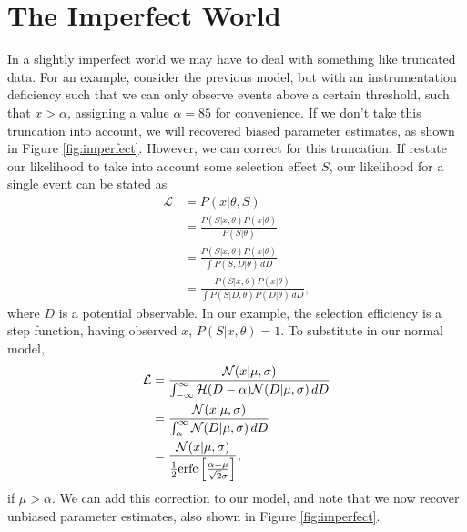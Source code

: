 \documentclass[a4paper,fleqn,usenatbib]{mnras}
\begin{document}
\section{The Imperfect World}

In a slightly imperfect world we may have to deal with something like truncated data. For an example, consider the previous model, but with an instrumentation deficiency such that we can only observe events above a certain threshold, such that $x > \alpha$, assigning a value $\alpha=85$ for convenience. If we don't take this truncation into account, we will recovered biased parameter estimates, as shown in Figure \ref{fig:imperfect}. However, we can correct for this truncation. If restate our likelihood to take into account some selection effect $S$, our likelihood for a single event can be stated as
\begin{align}
\mathcal{L} &= P(x | \theta, S)\\
&= \frac{P(S|x,\theta) P(x|\theta)}{P(S|\theta)} \\
&= \frac{P(S|x,\theta) P(x|\theta)}{\int P(S, D|\theta)\, dD} \\
&= \frac{P(S|x,\theta) P(x|\theta)}{\int P(S | D, \theta) P(D|\theta)\, dD},
\end{align}
where $D$ is a potential observable. In our example, the selection efficiency is a step function, having observed $x$, $P(S|x,\theta) = 1$. To substitute in our normal model,
\begin{align}
\mathcal{L} &= \frac{ \mathcal{N}(x|\mu, \sigma)}{\int_{-\infty}^\infty \mathcal{H}(D - \alpha) \mathcal{N}(D|\mu, \sigma)\, dD} \\
&= \frac{ \mathcal{N}(x|\mu, \sigma)}{\int_{\alpha}^\infty \mathcal{N}(D|\mu, \sigma)\, dD} \\
&= \frac{ \mathcal{N}(x|\mu, \sigma)}{\frac{1}{2} {\rm erfc}\left[ \frac{\alpha - \mu}{\sqrt{2}\sigma} \right]}, 
\end{align}
if $\mu > \alpha$. We can add this correction to our model, and note that we now recover unbiased parameter estimates, also shown in Figure \ref{fig:imperfect}.
\end{document}
